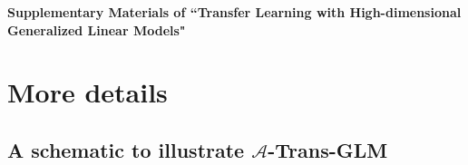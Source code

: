 \documentclass[12pt]{article}
\newcommand{\ma}{\mathcal{A}}
\newcommand{\<}{\langle}
\renewcommand{\>}{\rangle}
\begin{document}

\begin{appendices}
\end{appendices}


{\small
}



\newpage
\setcounter{page}{1}
\setcounter{section}{0}
\renewcommand{\thesection}{S.\arabic{section}}
\renewcommand{\theequation}{\thesection.\arabic{equation}}
\begin{center}
{\large\bf Supplementary Materials of ``Transfer Learning with High-dimensional Generalized Linear Models"}
\end{center}
\renewcommand{\cftsecnumwidth}{30pt}
\tableofcontents
{}

\section{More details}

\subsection{A schematic to illustrate $\ma$-Trans-GLM}\label{subsec: schematic}
\end{document}
